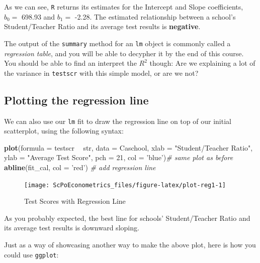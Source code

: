 \documentclass[]{book}
\newenvironment{Shaded}{\begin{snugshade}}{\end{snugshade}}
\newcommand{\KeywordTok}[1]{\textcolor[rgb]{0.13,0.29,0.53}{\textbf{#1}}}
\newcommand{\DataTypeTok}[1]{\textcolor[rgb]{0.13,0.29,0.53}{#1}}
\newcommand{\DecValTok}[1]{\textcolor[rgb]{0.00,0.00,0.81}{#1}}
\newcommand{\StringTok}[1]{\textcolor[rgb]{0.31,0.60,0.02}{#1}}
\newcommand{\CommentTok}[1]{\textcolor[rgb]{0.56,0.35,0.01}{\textit{#1}}}
\newcommand{\OperatorTok}[1]{\textcolor[rgb]{0.81,0.36,0.00}{\textbf{#1}}}
\newcommand{\NormalTok}[1]{#1}
\theoremstyle{definition}
\theoremstyle{definition}
\theoremstyle{definition}
\theoremstyle{remark}
\begin{document}
As we can see, \texttt{R} returns its estimates for the Intercept and
Slope coefficients, \(b_0 =\) 698.93 and \(b_1 =\) -2.28. The estimated
relationship between a school's Student/Teacher Ratio and its average
test results is \textbf{negative}.

The output of the \texttt{summary} method for an \texttt{lm} object is
commonly called a \emph{regression table}, and you will be able to
decypher it by the end of this course. You should be able to find an
interpret the \(R^2\) though: Are we explaining a lot of the variance in
\texttt{testscr} with this simple model, or are we not?

\subsection{Plotting the regression
line}\label{plotting-the-regression-line}

We can also use our \texttt{lm} fit to draw the regression line on top
of our initial scatterplot, using the following syntax:

\begin{Shaded}
\begin{Highlighting}[]
\KeywordTok{plot}\NormalTok{(}\DataTypeTok{formula =}\NormalTok{ testscr }\OperatorTok{~}\StringTok{ }\NormalTok{str,}
     \DataTypeTok{data =}\NormalTok{ Caschool,}
     \DataTypeTok{xlab =} \StringTok{"Student/Teacher Ratio"}\NormalTok{,}
     \DataTypeTok{ylab =} \StringTok{"Average Test Score"}\NormalTok{, }\DataTypeTok{pch =} \DecValTok{21}\NormalTok{, }\DataTypeTok{col =} \StringTok{'blue'}\NormalTok{)}\CommentTok{# same plot as before}
\KeywordTok{abline}\NormalTok{(fit_cal, }\DataTypeTok{col =} \StringTok{'red'}\NormalTok{) }\CommentTok{# add regression line}
\end{Highlighting}
\end{Shaded}

\begin{figure}

{\centering \texttt{[image: ScPoEconometrics\_files/figure-latex/plot-reg1-1]} 

}

\caption{Test Scores with Regression Line}\label{fig:plot-reg1}
\end{figure}

As you probably expected, the best line for schools' Student/Teacher
Ratio and its average test results is downward sloping.

Just as a way of showcasing another way to make the above plot, here is
how you could use \texttt{ggplot}:
\end{document}
